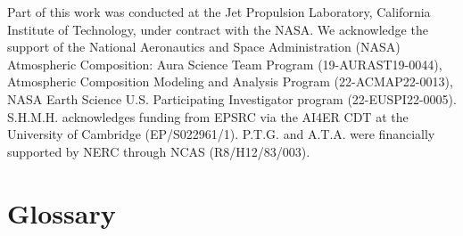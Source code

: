 \documentclass[gmd, manuscript]{copernicus}
\begin{document}










\begin{acknowledgements}
Part of this work was conducted at the Jet Propulsion Laboratory, California Institute of Technology, under contract with the NASA. We acknowledge the support of the National Aeronautics and Space Administration (NASA) Atmospheric Composition: Aura Science Team Program (19-AURAST19-0044), Atmospheric Composition Modeling and Analysis Program (22-ACMAP22-0013), NASA Earth Science U.S. Participating Investigator program (22-EUSPI22-0005).
S.H.M.H. acknowledges funding from EPSRC via the AI4ER CDT at the University of Cambridge (EP/S022961/1). P.T.G. and A.T.A. were financially supported by NERC through NCAS (R8/H12/83/003).
\end{acknowledgements}










\appendix
\section{Glossary}    %
\end{document}
